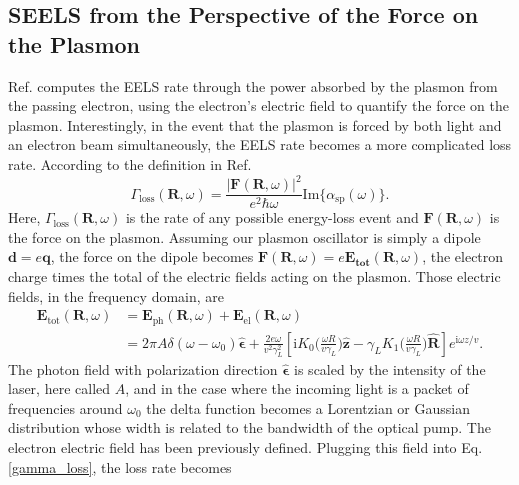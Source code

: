 \documentclass [11pt, proquest] {uwthesis}[2016/11/22]
\begin{document}
\subsection{SEELS from the Perspective of the Force on the Plasmon}

Ref. \cite{Quillin} computes the EELS rate through the power absorbed by the plasmon from the passing electron, using the electron's electric field to quantify the force on the plasmon. Interestingly, in the event that the plasmon is forced by both light and an electron beam simultaneously, the EELS rate becomes a more complicated loss rate. According to the definition in Ref. \cite{Quillin}
\begin{equation}
\Gamma_{\textrm{loss}}(\textbf{R},\omega) = \frac{|\textbf{F}(\textbf{R},\omega)|^2}{e^2\hbar\omega}\textrm{Im}\{\alpha_{\textrm{sp}}(\omega)\}.
\label{gamma_loss}
\end{equation}
Here, $\Gamma_{\textrm{loss}}(\textbf{R},\omega)$ is the rate of any possible energy-loss event and $\textbf{F}(\textbf{R},\omega)$ is the force on the plasmon. Assuming our plasmon oscillator is simply a dipole $\textbf{d}=e\textbf{q}$, the force on the dipole becomes $\textbf{F}(\textbf{R},\omega) = e\textbf{E}_{\textbf{tot}}(\textbf{R},\omega)$, the electron charge times the total of the electric fields acting on the plasmon. Those electric fields, in the frequency domain, are
\begin{equation}
\begin{aligned}
\textbf{E}_{\textrm{tot}}(\textbf{R},\omega) &= \textbf{E}_{\textrm{ph}}(\textbf{R},\omega) + \textbf{E}_{\textrm{el}}(\textbf{R},\omega)\\
& = 2\pi A\delta(\omega-\omega_0)\hat{\boldsymbol{\epsilon}} + \frac{2e\omega}{v^2\gamma_L^2}\left[ \textrm{i}K_0\big( \frac{\omega R}{v\gamma_L} \big)\hat{\textbf{z}} -  \gamma_L K_1\big( \frac{\omega R}{v\gamma_L} \big)\hat{\textbf{R}}\right]e^{\textrm{i}\omega z/v}.
\label{fields_sum}
\end{aligned}
\end{equation}
The photon field with polarization direction $\hat{\boldsymbol{\epsilon}}$ is scaled by the intensity of the laser, here called $A$, and in the case where the incoming light is a packet of frequencies around $\omega_0$ the delta function becomes a Lorentzian or Gaussian distribution whose width is related to the bandwidth of the optical pump. The electron electric field has been previously defined. Plugging this field into Eq. \ref{gamma_loss}, the loss rate becomes
\end{document}
